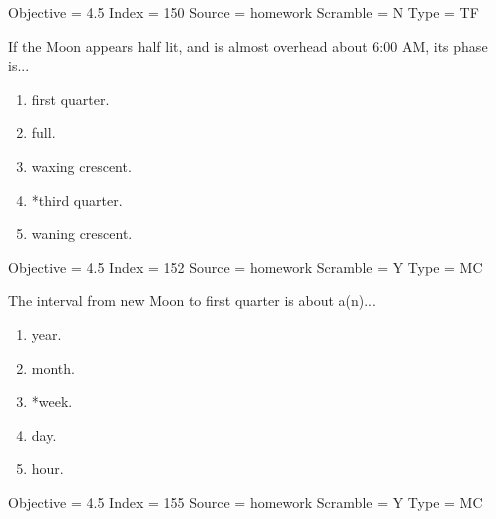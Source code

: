 \documentclass[11pt]{article}
\begin{document}
\begin{enumerate}
\begin{minipage}{\textwidth}
\begin{minipage}{\textwidth}
Objective = 4.5
Index = 150
Source = homework
Scramble = N
Type = TF
\end{minipage}
\end{minipage}
\vskip 0.20in

\begin{minipage}{\textwidth}
\begin{minipage}{\textwidth}
\item If the Moon appears half lit, and is almost overhead about 6:00 AM, its phase is...
\begin{multicols}{3}
\begin{enumerate} 
\setlength{\itemsep}{1pt} 
\setlength{\parskip}{0pt} 
\setlength{\parsep}{0pt}
\setlength{\multicolsep}{1pt} 
\item first quarter.
\item full.
\item waxing crescent.
\item *third quarter.
\item waning crescent.
\end{enumerate} 
\vfill 
\end{multicols}

Objective = 4.5
Index = 152
Source = homework
Scramble = Y
Type = MC
\end{minipage}
\end{minipage}
\vskip 0.20in

\begin{minipage}{\textwidth}
\begin{minipage}{\textwidth}
\item The interval from new Moon to first quarter is about a(n)...
\begin{multicols}{3}
\begin{enumerate} 
\setlength{\itemsep}{1pt} 
\setlength{\parskip}{0pt} 
\setlength{\parsep}{0pt}
\setlength{\multicolsep}{1pt} 
\item year.
\item month.
\item *week.
\item day.
\item hour.
\end{enumerate} 
\vfill 
\end{multicols}

Objective = 4.5
Index = 155
Source = homework
Scramble = Y
Type = MC
\end{minipage}
\end{minipage}
\vskip 0.20in


\end{enumerate}
\end{document}
